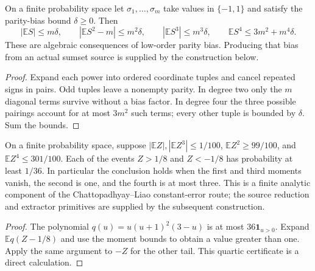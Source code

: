 \begin{theorem}
  \label{thm:lowerbounds-algebraic-parity-moments}
  \leanok
  On a finite probability space let $\sigma_1,\ldots,\sigma_m$ take
  values in $\{-1,1\}$ and satisfy the parity-bias bound $\delta\ge0$.
  Then
  \[
    |\mathbb E S|\le m\delta,\qquad
    |\mathbb E S^2-m|\le m^2\delta,\qquad
    |\mathbb E S^3|\le m^3\delta,\qquad
    \mathbb E S^4\le3m^2+m^4\delta.
  \]
  These are algebraic consequences of low-order parity bias. Producing
  that bias from an actual sumset source is supplied by the construction below.
\end{theorem}
\begin{proof}
  \leanok
  Expand each power into ordered coordinate tuples and cancel repeated
  signs in pairs. Odd tuples leave a nonempty parity. In degree two only
  the $m$ diagonal terms survive without a bias factor. In degree four
  the three possible pairings account for at most $3m^2$ such terms;
  every other tuple is bounded by $\delta$. Sum the bounds.
\end{proof}

\begin{theorem}
  \label{thm:lowerbounds-algebraic-extractor-fourth-moment}
  \leanok
  On a finite probability space, suppose
  $|\mathbb E Z|,|\mathbb E Z^3|\le1/100$,
  $\mathbb E Z^2\ge99/100$, and $\mathbb E Z^4\le301/100$.
  Each of the events $Z>1/8$ and $Z<-1/8$ has probability at least $1/36$.
  In particular the conclusion holds when the first and third moments
  vanish, the second is one, and the fourth is at most three.
  This is a finite analytic component of the Chattopadhyay--Liao
  constant-error route; the source reduction and extractor primitives
  are supplied by the subsequent construction.
\end{theorem}
\begin{proof}
  \leanok
  The polynomial $q(u)=u(u+1)^2(3-u)$ is at most
  $36\mathbf1_{u>0}$. Expand $\mathbb E q(Z-1/8)$ and use the moment
  bounds to obtain a value greater than one. Apply the same argument to
  $-Z$ for the other tail. This quartic certificate is a direct calculation.
\end{proof}

